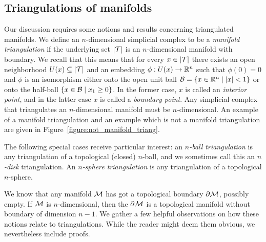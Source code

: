 \documentclass[10pt,a4paper]{article}
\begin{document}
\subsection{Triangulations of manifolds}\label{subsection:manifoldtriangulation}

Our discussion requires some notions and results concerning triangulated manifolds. 
We define an $n$-dimensional simplicial complex to be a \emph{manifold triangulation} if the underlying set $\left| {\mathcal T} \right|$ is an $n$-dimensional manifold with boundary.
We recall that this means that for every $x \in \left| {\mathcal T} \right|$
there exists an open neighborhood $U(x) \subseteq \left| {\mathcal T} \right|$ and an embedding $\phi : U(x) \rightarrow {\mathbb R}^{n}$
such that $\phi(0) = 0$ and $\phi$ is an isomorphism either onto the open unit ball $\calB = \{ x \in \bbR^{n} \suchthat |x| < 1 \}$
or onto the half-ball $\{ x \in \calB \suchthat x_1 \geq 0 \}$.
In the former case, $x$ is called an \emph{interior point}, and in the latter case $x$ is called a \emph{boundary point}. 
Any simplicial complex that triangulates an $n$-dimensional manifold must be $n$-dimensional. 
An example of a manifold triangulation and an example which is not a manifold triangulation are given in Figure~\ref{figure:not_manifold_triang}.

The following special cases receive particular interest:
an \textit{$n$-ball triangulation} is any triangulation of a topological (closed) $n$-ball, and we sometimes call this an \textit{$n$-disk} triangulation.
An \textit{$n$-sphere triangulation} is any triangulation of a topological $n$-sphere. 


We know that any manifold ${\mathcal M}$ has got a topological boundary $\partial{\mathcal M}$, possibly empty. 
If ${\mathcal M}$ is $n$-dimensional, then the $\partial{\mathcal M}$ is a topological manifold without boundary of dimension $n-1$. 
We gather a few helpful observations on how these notions relate to triangulations.
While the reader might deem them obvious, we nevertheless include proofs. 
\end{document}
